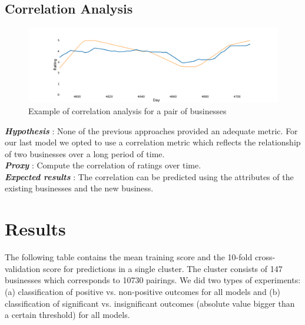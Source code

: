 \documentclass{vldb}
\begin{document}
\subsection*{Correlation Analysis}
\begin{figure}[h]
\centering
\includegraphics[width=\columnwidth]{corr.pdf}
\caption{Example of correlation analysis for a pair of businesses}
\end{figure}

\textbf{\textit{Hypothesis}} : None of the previous approaches provided an adequate metric.
For our last model we opted to use a correlation metric which reflects the relationship of two businesses over a long period of time.\\
\textbf{\textit{Proxy}} : Compute the correlation of ratings over time.\\
\textbf{\textit{Expected results}} : The correlation can be predicted using the attributes of the existing businesses and the new business. 


\section*{Results}
%
The following table contains the mean training score and the 10-fold cross-validation score for predictions in a single cluster.
The cluster consists of 147 businesses which corresponds to 10730 pairings.
We did two types of experiments: (a) classification of positive vs. non-positive outcomes for all models and (b) classification of significant vs. insignificant outcomes (absolute value bigger than a certain threshold) for all models.
\end{document}
